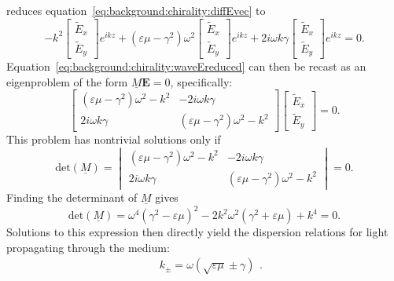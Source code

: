 reduces equation~\ref{eq:background:chirality:diffEvec} to
\begin{equation}\label{eq:background:chirality:waveEreduced}
    -k^2 \begin{bmatrix}\tilde E_x\\ \tilde E_y\end{bmatrix} e^{i k z} + (\varepsilon \mu - \gamma^2)\omega^2 \begin{bmatrix}\tilde E_x\\ \tilde E_y\end{bmatrix} e^{i k z} + 2 i \omega k \gamma \begin{bmatrix}\tilde E_x\\ \tilde E_y\end{bmatrix} e^{i k z} = 0.
\end{equation}
Equation~\ref{eq:background:chirality:waveEreduced} can then be recast as an eigenproblem of the form $\underline{M}\mathbf{E} = 0$, specifically:
\begin{equation}
    \begin{bmatrix}
		(\varepsilon \mu - \gamma^2)\omega^2 -k^2  & -2 i \omega k \gamma \\ 
		2 i \omega k \gamma & (\varepsilon \mu - \gamma^2)\omega^2 -k^2
    \end{bmatrix}
    \begin{bmatrix} 
        \tilde E_x \\ 
        \tilde E_y
    \end{bmatrix} 
    = 0.
\end{equation}
This problem has nontrivial solutions only if 
\begin{equation}
    \mathrm{det}(\underline{M}) = 
    \begin{vmatrix}
        (\varepsilon \mu - \gamma^2)\omega^2 -k^2  & -2 i \omega k \gamma \\ 
		2 i \omega k \gamma & (\varepsilon \mu - \gamma^2)\omega^2 -k^2
    \end{vmatrix}    
    = 0.
\end{equation}
Finding the determinant of $\underline{M}$ gives
\begin{equation}
    \mathrm{det}(\underline{M}) = 
    \omega^4 (\gamma^2 - \varepsilon \mu)^2 - 2 k^2 \omega^2 (\gamma^2 + \varepsilon \mu) + k^4
    = 0.
\end{equation}
Solutions to this expression then directly yield the dispersion relations for light propagating through the medium:
\begin{equation}
    \begin{split}
        & k_{\pm} = \omega (\sqrt{\varepsilon \mu} \pm \gamma)
    \end{split}.
\end{equation}
